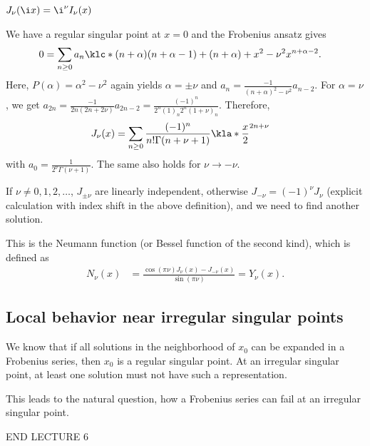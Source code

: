 \documentclass[english, parskip=full]{scrbook}
\newcommand{\note}[1]{\begin{tcolorbox}[colback=colorbackgroundnote,colframe=colornote, breakable,enhanced]#1\end{tcolorbox}}
\newcommand{\example}[3]{\begin{tcolorbox}[colback=colorbackgroundexample,colframe=colorexample, breakable,enhanced,title={\textbf{#1}: #2.}]#3\end{tcolorbox}}
\begin{document}
\example{Bessel Functions}{$y'' + \frac{1}{x}y' + \kla*{1 - \frac{\nu^2}{x^2}}y = 0$}{
\note{$J_\nu(\i x) = \i^{\nu} I_\nu(x)$}
We have a regular singular point at $x=0$ and the Frobenius ansatz gives
\begin{align}
0 &= \sum_{n\ge 0} a_n \klc*{(n+\alpha)(n+\alpha-1) + (n+\alpha) + x^2 - \nu^2 } x^{n+\alpha-2}.
\end{align}
Here, $P(\alpha) = \alpha^2 - \nu^2$ again yields $\alpha = \pm \nu$ and $a_n = \frac{-1}{(n+\alpha)^2 - \nu^2} a_{n-2}$.
For $\alpha=\nu$, we get $a_{2n} = \frac{-1}{2n(2n+2\nu)}a_{2n-2} = \frac{(-1)^n}{2^n (1)_n 2^n (1+\nu)_n}$.
Therefore,
\begin{align}
J_\nu(x) &= \sum_{n\ge 0} \frac{(-1)^n}{n! \Gamma(n+\nu+1)} \kla*{\frac{x}{2}}^{2n+\nu}
\end{align}
with $a_0=\frac{1}{2^\nu\Gamma(\nu+1)}$.
The same also holds for $\nu\rightarrow -\nu$.

If $\nu\neq 0,1,2,\dots$, $J_{\pm\nu}$ are linearly independent, otherwise $J_{-\nu} = (-1)^\nu J_\nu$ (explicit calculation with index shift in the above definition), and we need to find another solution.

This is the Neumann function (or Bessel function of the second kind), which is defined as
\begin{align}
N_\nu(x) &= \frac{\cos(\pi\nu) J_\nu(x) - J_{-\nu}(x)}{\sin(\pi\nu)} = Y_\nu(x).
\end{align}
}

\subsection{Local behavior near irregular singular points}
We know that if all solutions in the neighborhood of $x_0$ can be expanded in a Frobenius series, then $x_0$ is a regular singular point.
At an irregular singular point, at least one solution must not have such a representation.

This leads to the natural question, how a Frobenius series can fail at an irregular singular point.

END LECTURE 6
\end{document}
